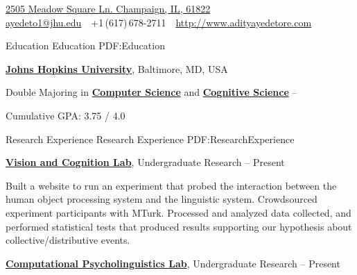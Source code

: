 \documentclass[letterpaper,MMMyyyy,nonstopmode,14pt]{simpleresumecv}
\newcommand{\CVAuthor}{Aditya Yedetore}
\newcommand{\CVWebpage}{http://www.adityayedetore.com}
\begin{document}

\Title{\CVAuthor}

\begin{SubTitle}
\href{https://www.google.com/maps/place/2505+Meadow+Square+Ln,+Champaign,+IL+61822}
{2505 Meadow Square Ln. Champaign, IL, 61822} \\
\href{mailto:ayedeto1@jhu.edu}
{ayedeto1@jhu.edu}
\,\SubBulletSymbol\,
+1\,(617)\,678-2711
\,\SubBulletSymbol\,
\href{\CVWebpage}
{\url{\CVWebpage}}
\end{SubTitle}

\begin{Body}


\Section
{Education}
{Education}
{PDF:Education}

\Entry
\href{https://www.jhu.edu}
{\textbf{Johns Hopkins University}},
Baltimore, MD, USA

\Gap
\BulletItem
Double Majoring in 
\href{https://www.cs.jhu.edu}
{\textbf{Computer Science}}
and 
\href{https://cogsci.jhu.edu}
{\textbf{Cognitive Science}}
\hfill
{} -- 

\begin{Detail}
	\SubBulletItem
	Cumulative GPA: 3.75 / 4.0
\end{Detail}


\Section
{Research Experience}
{Research Experience}
{PDF:ResearchExperience}

\Entry
\href{https://www.halberdalab.net/}
    {\textbf{Vision and Cognition Lab}},
Undergraduate Research
\hfill
{} --
Present

\BulletItem Built a website to run an experiment that probed the interaction between the human object processing system and the linguistic system. 
\BulletItem Crowdsourced experiment participants with MTurk.
\BulletItem Processed and analyzed data collected, and performed statistical tests that produced results supporting our hypothesis about collective/distributive events. 

\Gap
\Gap
\Entry
\href{http://www.example.com/my-institute}
{\textbf{Computational Psycholinguistics Lab}},
Undergraduate Research
\hfill
{} --
Present


\end{Body}
\end{document}
